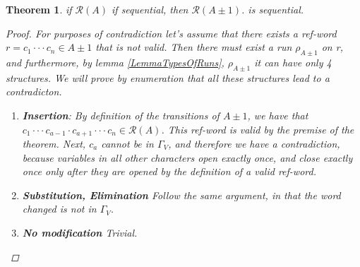 \documentclass{article}
\newtheorem{theorem}{Theorem}
\begin{document}
\begin{theorem} \label{TheoremApm1Sequential}
    if $\mathcal{R}(A)$ if sequential, then $\mathcal{R}(A \pm 1)$.
    is sequential.
    
    \begin{proof}
	For purposes of contradiction let's assume that there exists
	a ref-word $r = c_1 \cdot \cdot\cdot c_n \in A \pm 1$ that
	is not valid. Then there must exist a run $\rho_{A\pm 1}$
    on r, and furthermore, by lemma \ref{LemmaTypesOfRuns}, $\rho_{A\pm1}$
    it can have only 4 structures. We will prove by enumeration that all
    these structures lead to a contradicton.
    \begin{enumerate}
        \item \textbf{Insertion}: By definition of the transitions
        of $A \pm 1$, we have that $c_1 \cdot\cdot\cdot c_{a-1}
        \cdot c_{a+1} \cdot\cdot\cdot c_{n} \in \mathcal{R}(A)$.
        This ref-word is valid by the premise of the theorem. Next,
        $c_a$ cannot be in $\Gamma_V$, and therefore we have a
        contradiction, because variables in all other characters
        open exactly once, and close exactly once only after they
        are opened by the definition of a valid ref-word.
        \item \textbf{Substitution, Elimination} Follow the same argument, in that the word changed is not in $\Gamma_V$.
        \item \textbf{No modification} Trivial.
        \end{enumerate}
    \end{proof}
\end{theorem}
\end{document}
